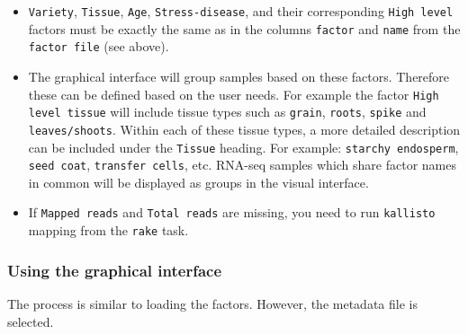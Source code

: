 \begin{itemize}
\itemsep1pt\parskip0pt
\item
  \lstinline!Variety!, \lstinline!Tissue!, \lstinline!Age!,
  \lstinline!Stress-disease!, and their corresponding
  \lstinline!High level! factors must be exactly the same as in the
  columns \lstinline!factor! and \lstinline!name! from the
  \lstinline!factor file! (see above).
\item
  The graphical interface will group samples based on these factors.
  Therefore these can be defined based on the user needs. For example
  the factor \lstinline!High level tissue! will include tissue types
  such as \lstinline!grain!, \lstinline!roots!, \lstinline!spike! and
  \lstinline!leaves/shoots!. Within each of these tissue types, a more
  detailed description can be included under the \lstinline!Tissue!
  heading. For example: \lstinline!starchy endosperm!,
  \lstinline!seed coat!, \lstinline!transfer cells!, etc. RNA-seq
  samples which share factor names in common will be displayed as groups
  in the visual interface.
\item
  If \lstinline!Mapped reads! and \lstinline!Total reads! are missing,
  you need to run \lstinline!kallisto! mapping from the \lstinline!rake!
  task.
\end{itemize}

\subsubsection{Using the graphical
interface}\label{using-the-graphical-interface}

The process is similar to loading the factors. However, the metadata
file is selected.

